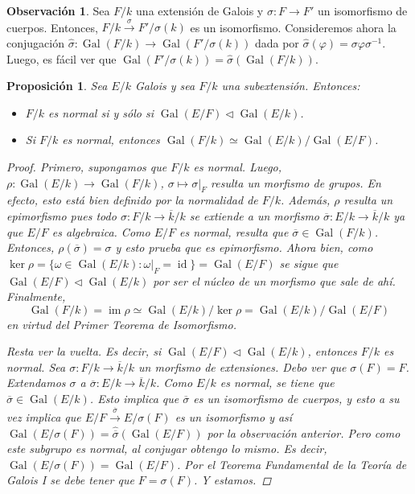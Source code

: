 \documentclass[12pt]{book}
\newtheorem{prop}[teo]{Proposición}
\theoremstyle{definition}
\newtheorem{obs}[teo]{Observación}
\DeclareMathOperator{\id}{id}
\DeclareMathOperator{\im}{im}
\DeclareMathOperator{\Gal}{Gal}
\begin{document}
\begin{obs}
Sea $F/k$ una extensión de Galois y $\sigma:F\to F'$ un isomorfismo de cuerpos. Entonces, $F/k\stackrel{\sigma}{\longrightarrow} F'/\sigma(k)$ es un isomorfismo. Consideremos ahora la conjugación $\widehat{\sigma}:\Gal(F/k)\to \Gal(F'/\sigma(k))$ dada por $\widehat{\sigma}(\varphi) = \sigma\varphi\sigma^{-1}$. Luego, es fácil ver que $\Gal(F'/\sigma(k)) = \widehat{\sigma}(\Gal(F/k))$.
\end{obs}

\begin{prop}
Sea $E/k$ Galois y sea $F/k$ una subextensión. Entonces:
\begin{itemize}
\item $F/k$ es normal si y sólo si $\Gal(E/F)\triangleleft \Gal(E/k)$.
\item Si $F/k$ es normal, entonces $\Gal(F/k) \simeq \Gal(E/k)/\Gal(E/F)$.
\end{itemize}
\begin{proof}

Primero, supongamos que $F/k$ es normal. Luego, $\rho:\Gal(E/k)\to \Gal(F/k)$, $\sigma\mapsto\left.\sigma\right|_{F}$ resulta un morfismo de grupos. En efecto, esto está bien definido por la normalidad de $F/k$. Además, $\rho$ resulta un epimorfismo pues todo $\sigma:F/k\to \overline{k}/k$ se extiende a un morfismo $\overline{\sigma}:E/k\to\overline{k}/k$ ya que $E/F$ es algebraica. Como $E/F$ es normal, resulta que $\overline{\sigma}\in \Gal(F/k)$. Entonces, $\rho(\overline{\sigma})=\sigma$ y esto prueba que es epimorfismo. Ahora bien, como $\ker \rho = \{\omega\in\Gal(E/k) : \left.\omega\right|_{F}=\id\} = \Gal(E/F)$ se sigue que $\Gal(E/F)\triangleleft \Gal(E/k)$ por ser el núcleo de un morfismo que sale de ahí. Finalmente, $$\Gal(F/k) = \im \rho \simeq \Gal(E/k)/\ker\rho = \Gal(E/k)/\Gal(E/F)$$ en virtud del Primer Teorema de Isomorfismo.

Resta ver la vuelta. Es decir, si $\Gal(E/F)\triangleleft\Gal(E/k)$, entonces $F/k$ es normal. Sea $\sigma:F/k\to \overline{k}/k$ un morfismo de extensiones. Debo ver que $\sigma(F)=F$. Extendamos $\sigma$ a $\overline{\sigma}:E/k\to\overline{k}/k$. Como $E/k$ es normal, se tiene que $\overline{\sigma}\in\Gal(E/k)$. Esto implica que $\overline{\sigma}$ es un isomorfismo de cuerpos, y esto a su vez implica que $E/F\stackrel{\overline{\sigma}}{\longrightarrow} E/\sigma(F)$ es un isomorfismo y así $\Gal(E/\sigma(F)) = \widehat{\overline{\sigma}}(\Gal(E/F))$ por la observación anterior. Pero como este subgrupo es normal, al conjugar obtengo lo mismo. Es decir, $\Gal(E/\sigma(F)) = \Gal(E/F)$. Por el Teorema Fundamental de la Teoría de Galois I se debe tener que $F=\sigma(F)$. Y estamos.

\end{proof}
\end{prop}
\end{document}
